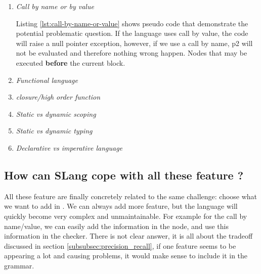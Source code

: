 \begin{enumerate}
	\item \textit{Call by name or by value} \newline
	
	
	Listing \ref{lst:call-by-name-or-value} shows pseudo code that demonstrate the potential problematic question. If the language uses call by value, the code will raise a null pointer exception, however, if we use a call by name, p2 will not be evaluated and therefore nothing wrong happen.
	Nodes that may be executed \textbf{before} the current block.\newline
	\item \textit{Functional language} \newline
	\item \textit{closure/high order function} \newline
	\item \textit{Static vs dynamic scoping} \newline
	\item \textit{Static vs dynamic typing} \newline
	\item \textit{Declarative vs imperative language} \newline
\end{enumerate}

\subsection{How can SLang cope with all these feature ?}
\label{subsec:how_can_slang_cope_with_features}

All these feature are finally concretely related to the same challenge: choose what we want to add in \slang. 
We can always add more feature, but the language will quickly become very complex and unmaintainable. For example for the call by name/value, we can easily add the information in the node, and use this information in the checker. 
There is not clear answer, it is all about the tradeoff discussed in section \ref{subsubsec:precision_recall}, if one feature seems to be appearing a lot and causing problems, it would make sense to include it in the grammar.
